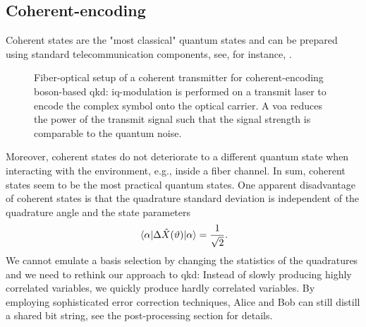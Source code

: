 \FloatBarrier
\subsection{Coherent-encoding}

Coherent states are the "most classical" quantum states and can be prepared using standard telecommunication components, see, for instance, .
\begin{figure}[htb]
	\centering
	
	\caption{Fiber-optical setup of a coherent transmitter for coherent-encoding boson-based \gls{qkd}: \gls{iq}-modulation is performed on a transmit laser to encode the complex symbol onto the optical carrier. A \gls{voa} reduces the power of the transmit signal such that the signal strength is comparable to the quantum noise.}\label{fig:coherent_transmitter}
\end{figure}
Moreover, coherent states do not deteriorate to a different quantum state when interacting with the environment, e.g., inside a fiber channel.
In sum, coherent states seem to be the most practical quantum states.
One apparent disadvantage of coherent states is that the quadrature standard deviation is independent of the quadrature angle and the state parameters~\cite[p.~59]{Barnett2002}
\begin{equation}
	\expval{\Delta\hat{X}(\vartheta)}{\alpha}
	=
	\frac{1}{\sqrt{2}}
	.
\end{equation}
We cannot emulate a basis selection by changing the statistics of the quadratures and we need to rethink our approach to \gls{qkd}:
Instead of slowly producing highly correlated variables, we quickly produce hardly correlated variables.
By employing sophisticated error correction techniques, Alice and Bob can still distill a shared bit string, see the post-processing section for details.

